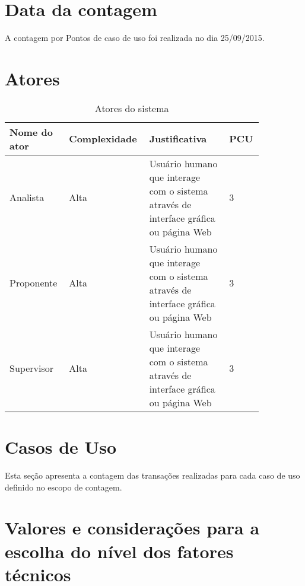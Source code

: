 \section{Data da contagem}
  
  A contagem por Pontos de caso de uso foi realizada no dia 25/09/2015.

\section{Atores}

\begin{table*}[!h]
\centering
\caption{Atores do sistema}
\label{Rotulo}
  \begin{tabular}{|p{0.20\linewidth}|p{0.25\linewidth}|p{0.30\linewidth}|p{0.10\linewidth}|}
  \hline
  \textbf{Nome do ator} & \textbf{Complexidade} & \textbf{Justificativa} & \textbf{PCU} \\ 
  \hline

  Analista & Alta & Usuário humano que interage com o sistema através de interface gráfica ou página Web& 3 \\
  \hline
  Proponente & Alta & Usuário humano que interage com o sistema através de interface gráfica ou página Web& 3\\
  \hline
  Supervisor & Alta & Usuário humano que interage com o sistema através de interface gráfica ou página Web& 3\\
  \hline
  \end{tabular}
\end{table*}

\section{Casos de Uso}
  
  Esta seção apresenta a contagem das transações realizadas para cada caso de uso definido no escopo de contagem.

  

\section{Valores e considerações para a escolha do nível dos fatores técnicos}
  
